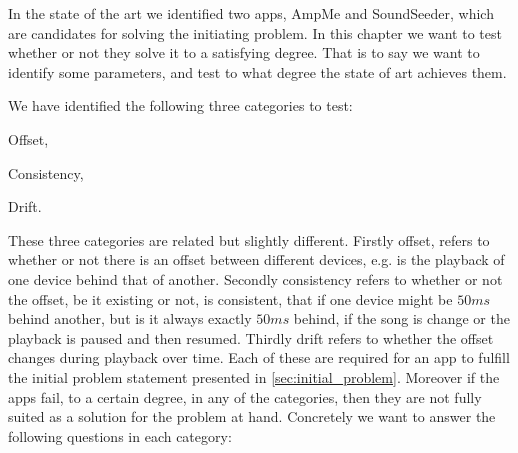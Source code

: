 In the state of the art we identified two apps, AmpMe and SoundSeeder, which are candidates for solving the initiating problem. 
In this chapter we want to test whether or not they solve it to a satisfying degree. 
That is to say we want to identify some parameters, and test to what degree the state of art achieves them.

We have identified the following three categories to test:
\begin{enumerate*}[label=(\alph*)]
    \item Offset,
    \item Consistency,
    \item Drift.
\end{enumerate*}

These three categories are related but slightly different. 
Firstly offset, refers to whether or not there is an offset between different devices, e.g. is the playback of one device behind that of another.
Secondly consistency refers to whether or not the offset, be it existing or not, is consistent, that if one device might be $50 ms$ behind another, but is it always exactly $50 ms$ behind, if the song is change or the playback is paused and then resumed.
Thirdly drift refers to whether the offset changes during playback over time.
Each of these are required for an app to fulfill the initial problem statement presented in \vref{sec:initial_problem}.
Moreover if the apps fail, to a certain degree, in any of the categories, then they are not fully suited as a solution for the problem at hand. 
Concretely we want to answer the following questions in each category:

